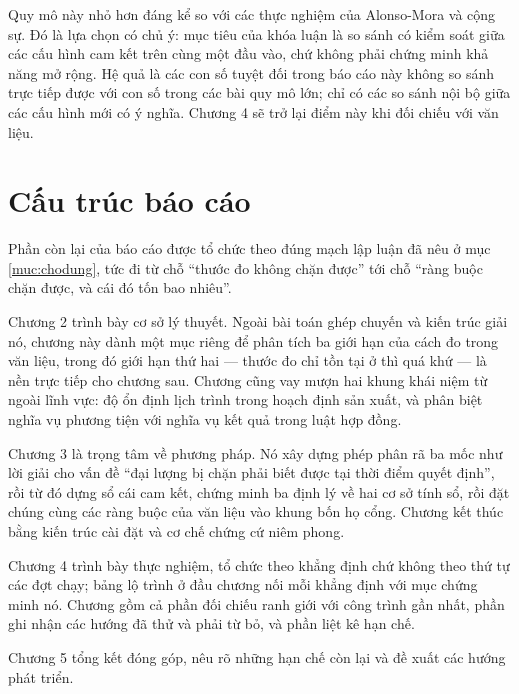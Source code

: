 Quy mô này nhỏ hơn đáng kể so với các thực nghiệm của Alonso-Mora và cộng sự. Đó là lựa chọn
có chủ ý: mục tiêu của khóa luận là so sánh có kiểm soát giữa các cấu hình cam kết trên cùng
một đầu vào, chứ không phải chứng minh khả năng mở rộng. Hệ quả là các con số tuyệt đối trong
báo cáo này không so sánh trực tiếp được với con số trong các bài quy mô lớn; chỉ có các so
sánh nội bộ giữa các cấu hình mới có ý nghĩa. Chương 4 sẽ trở lại điểm này khi đối chiếu với
văn liệu.

\section{Cấu trúc báo cáo}

Phần còn lại của báo cáo được tổ chức theo đúng mạch lập luận đã nêu ở mục \ref{muc:chodung},
tức đi từ chỗ
``thước đo không chặn được'' tới chỗ ``ràng buộc chặn được, và cái đó tốn bao nhiêu''.

Chương 2 trình bày cơ sở lý thuyết. Ngoài bài toán ghép chuyến và kiến trúc giải nó, chương này
dành một mục riêng để phân tích ba giới hạn của cách đo trong văn liệu, trong đó giới hạn thứ
hai --- thước đo chỉ tồn tại ở thì quá khứ --- là nền trực tiếp cho chương sau. Chương cũng vay
mượn hai khung khái niệm từ ngoài lĩnh vực: độ ổn định lịch trình trong hoạch định sản xuất, và
phân biệt nghĩa vụ phương tiện với nghĩa vụ kết quả trong luật hợp đồng.

Chương 3 là trọng tâm về phương pháp. Nó xây dựng phép phân rã ba mốc như lời giải cho vấn đề
``đại lượng bị chặn phải biết được tại thời điểm quyết định'', rồi từ đó dựng sổ cái cam kết,
chứng minh ba định lý về hai cơ sở tính sổ, rồi đặt chúng cùng các ràng buộc của văn liệu vào
khung bốn họ cổng. Chương kết thúc bằng kiến trúc cài đặt và cơ chế chứng cứ niêm phong.

Chương 4 trình bày thực nghiệm, tổ chức theo khẳng định chứ không theo thứ tự các đợt chạy;
bảng lộ trình ở đầu chương nối mỗi khẳng định với mục chứng minh nó. Chương gồm cả phần đối
chiếu ranh giới với công trình gần nhất, phần ghi nhận các hướng đã thử và phải từ bỏ, và phần
liệt kê hạn chế.

Chương 5 tổng kết đóng góp, nêu rõ những hạn chế còn lại và đề xuất các hướng phát triển.
